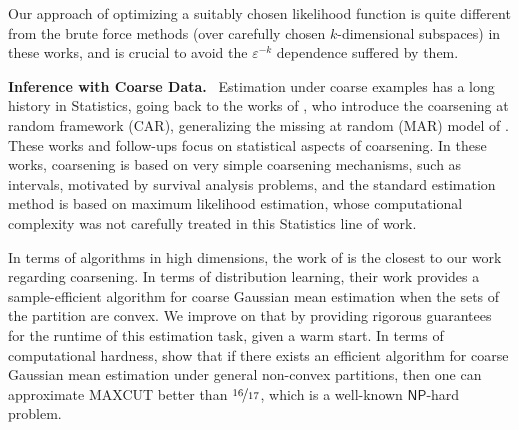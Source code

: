 \documentclass[11pt,letterpaper]{article}
\theoremstyle{plain}
\theoremstyle{definition}
\theoremstyle{remark}
\newcommand{\nfrac}[2]{\nicefrac{#1}{#2}}
\newcommand{\eps}{\varepsilon}
\renewcommand{\paragraph}[1]{\medskip \noindent\textbf{#1}~}
\newcommand{\maxcut}{\textsf{MAXCUT}\xspace}
\newcommand{\NP}{\ensuremath{\mathsf{NP}}\xspace}
\begin{document}
            {Our approach of optimizing a suitably chosen likelihood function is quite different {from the brute force methods (over carefully chosen $k$-dimensional subspaces) in these works, and is crucial to avoid the $\eps^{-k}$ dependence suffered by them}.

\paragraph{Inference with Coarse Data.}
Estimation under coarse examples has a long history in Statistics,
going back to the works of \citet{heitjan1990inference,heitjan1991ignorability,heitjan1993ignorability}, who introduce the coarsening at random framework (CAR), generalizing the missing at random (MAR) model of \citet{rubin1976inference,little1989analysis}. These works and follow-ups \cite{little2019statistical,gill1997coarsening,robins1992recovery,van1996efficient,jacobsen1995coarsening,grunwald2003updating}  focus on statistical aspects of coarsening. In these works, coarsening is based on very simple coarsening mechanisms, such as intervals, motivated by survival analysis problems, and the standard estimation method is based on maximum likelihood estimation, whose computational complexity was not carefully treated in this Statistics line of work. 

In terms of algorithms in high dimensions, the work of
\cite{fotakis2021coarse} is the closest to our work regarding coarsening. In terms of distribution learning, their work provides a sample-efficient algorithm for coarse Gaussian mean estimation when the sets of the partition are convex. We improve on that by providing rigorous guarantees for the runtime of this estimation task, given a warm start.
In terms of computational hardness, \cite{fotakis2021coarse} show that if there exists an efficient algorithm for coarse Gaussian mean estimation under general non-convex partitions, then one can approximate \maxcut{} better than $\nfrac{16}{17}$, which is a well-known $\NP$-hard problem. 

}
\end{document}
